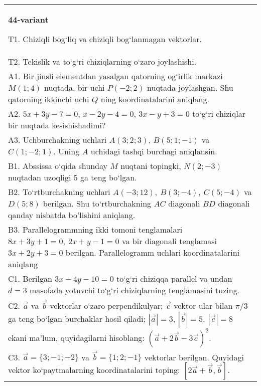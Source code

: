 \documentclass{article}
\begin{document}
\begin{tabular}{m{17cm}}
\textbf{44-variant}

T1. 
Chiziqli bog‘liq va chiziqli bog‘lanmagan vektorlar.
 \\
T2. 
Tekislik va to‘g‘ri chiziqlarning o‘zaro joylashishi.
 \\
A1. 
Bir jinsli elementdan yasalgan qatorning og‘irlik markazi
$M (1;4) $ nuqtada, bir uchi $P (-2;2) $ nuqtada joylashgan. Shu
qatorning ikkinchi uchi $Q$ ning koordinatalarini aniqlang.
 \\
A2. 
$5x+3y-7=0$, $x-2y-4=0$, $3x-y+3=0$
to‘g‘ri chiziqlar bir nuqtada kesishishadimi?
 \\
A3. 
Uchburchakning uchlari
$A (3;2; 3) $, $B (5;1; - 1) $ va $C (1; -2;1) $. Uning $A$ uchidagi tashqi burchagi aniqlansin.
 \\
B1. 
Abssissa o‘qida shunday $M$ nuqtani topingki,
\(N (2;-3) \) nuqtadan uzoqligi 5 ga teng bo‘lgan.
 \\
B2. 
To‘rtburchakning uchlari
\(A (-3;12),\ B (3;-4),\ C (5;-4) \) va \(D (5;8) \) berilgan. Shu
to‘rtburchakning $AC$ diagonali $BD$ diagonali qanday
nisbatda bo'lishini aniqlang.
 \\
B3. 
Parallelogrammning ikki tomoni tenglamalari
\(8x+3y+1=0,\ 2x+y-1=0\) va bir diagonali tenglamasi
\(3x+2y+3=0\) berilgan. Parallelogramm uchlari koordinatalarini
aniqlang
 \\
C1. 
Berilgan \(3x-4y-10=0\) to‘g‘ri chiziqqa parallel va undan
$d=3$ masofada yotuvchi to‘g‘ri chiziqlarning tenglamasini tuzing.
 \\
C2. 
$\vec{a}$ va $\vec{b}$ vektorlar o‘zaro perpendikulyar; $\vec{c}$ vektor ular bilan $\pi/3$ ga teng bo‘lgan burchaklar hosil qiladi; $|\vec{a}| = 3$, $|\vec{b}| = 5,\ |\vec{c}| = 8$ ekani ma’lum, quyidagilarni hisoblang:
$ (\vec{a} + 2\vec{b} - 3\vec{c}) ^{2}$.
 \\
C3. 
$\vec{a} = \{ 3; - 1; - 2\}$ va $\vec{b} = \{ 1;2; - 1\}$ vektorlar berilgan. Quyidagi vektor ko‘paytmalarning koordinatalarini toping:
$\left\lbrack 2\vec{a} + \vec{b},\vec{b} \right\rbrack$.
 \\

\end{tabular}
\vspace{1cm}
\end{document}
